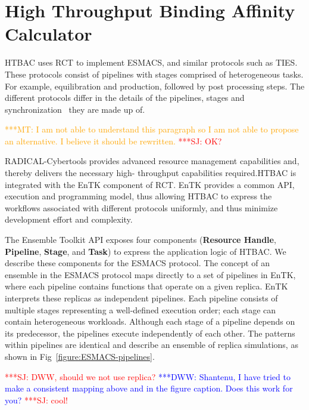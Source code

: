 \documentclass[conference]{IEEEtran}
\newcommand{\jhanote}[1]{ {\textcolor{red} { ***SJ: #1 }}}
\newcommand{\mtnote}[1]{ {\textcolor{orange} { ***MT: #1 }}}
\newcommand{\dwwnote}[1]{ {\textcolor{blue} { ***DWW: #1 }}}
\newcommand{\jhanote}[1]{}
\newcommand{\mtnote}[1]{}
\newcommand{\dwwnote}[1]{}
\begin{document}
%
%
 

%
%
%
\section{High Throughput Binding Affinity Calculator}\label{sec:htbac}
%

HTBAC uses RCT to implement ESMACS, and similar
protocols such as TIES\@. These protocols consist of pipelines with stages
comprised of heterogeneous tasks. For example, equilibration and production,
followed by post processing steps. The different protocols differ in the details of the pipelines, stages and
synchronization~\cite{Bhati2017} they are made up of.

\mtnote{I am not able to understand this paragraph so I am not able to propose
an alternative. I believe it should be rewritten.}\jhanote{OK?}

RADICAL-Cybertools provides advanced resource management capabilities and,
thereby delivers the necessary high- throughput capabilities required.HTBAC is
integrated with the EnTK component of RCT. EnTK provides a common API,
execution and programming model, thus allowing HTBAC to express the workflows
associated with different protocols uniformly, and thus minimize development
effort and complexity.

The Ensemble Toolkit API exposes four components (\textbf{Resource Handle},
\textbf{Pipeline}, \textbf{Stage}, and \textbf{Task}) to express the
application logic of HTBAC\@. We describe these components for the ESMACS
protocol\@. The concept of an ensemble in the ESMACS protocol maps directly to
a set of pipelines in EnTK, where each pipeline contains functions that operate
on a given replica. EnTK interprets these replicas as independent pipelines.
Each pipeline consists of multiple stages representing a well-defined execution
order; each stage can contain heterogeneous workloads. Although each stage of a
pipeline depends on its predecessor, the pipelines execute independently of each
other. The patterns within pipelines are identical and describe an ensemble of replica
simulations, as shown in Fig~\ref{figure:ESMACS-pipelines}.

\jhanote{DWW, should we not use replica?}
\dwwnote{Shantenu, I have tried to make a consistent mapping above
         and in the figure caption. Does this work for you?}\jhanote{cool!}
\end{document}
